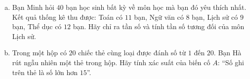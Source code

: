 \begin{bt}%
\begin{enumerate}[a)]
	\item Bạn Minh hỏi $40$ bạn học sinh bất kỳ về môn học mà bạn đó yêu thích nhất. Kết quả thống kê thu được: Toán có $11$ bạn, Ngữ văn có $8$ bạn, Lịch sử có $9$ bạn, Thể dục có $12$ bạn. Hãy chỉ ra tần số và tính tần số tương đối của môn Lịch sử.
	\item Trong một hộp có $20$ chiếc thẻ cùng loại được đánh số từ $1$ đến $20$. Bạn Hà rút ngẫu nhiên một thẻ trong hộp. Hãy tính xác suất của biến cố $A$: ``Số ghi trên thẻ là số lớn hơn $15$''.
\end{enumerate}
\end{bt}

